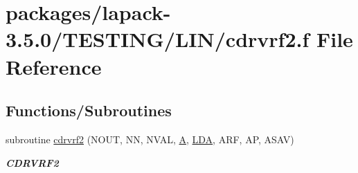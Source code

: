 \hypertarget{cdrvrf2_8f}{}\section{packages/lapack-\/3.5.0/\+T\+E\+S\+T\+I\+N\+G/\+L\+I\+N/cdrvrf2.f File Reference}
\label{cdrvrf2_8f}
\subsection*{Functions/\+Subroutines}
\begin{DoxyCompactItemize}
\item 
subroutine \hyperlink{group__complex__lin_ga86d8e46945f44522b0c98bd8902651f7}{cdrvrf2} (N\+O\+U\+T, N\+N, N\+V\+A\+L, \hyperlink{classA}{A}, \hyperlink{example__user_8c_ae946da542ce0db94dced19b2ecefd1aa}{L\+D\+A}, A\+R\+F, A\+P, A\+S\+A\+V)
\begin{DoxyCompactList}\small\item\em {\bfseries C\+D\+R\+V\+R\+F2} \end{DoxyCompactList}\end{DoxyCompactItemize}
